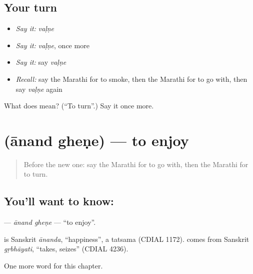 \subsection*{Your turn}
\begin{itemize}
\raggedright
  \item \emph{Say it:} \emph{vaḷṇe}
  \item \emph{Say it:} \emph{vaḷṇe}, once more
  \item \emph{Say it:} say \emph{vaḷṇe}
  \item \emph{Recall:} say the Marathi for to smoke, then the Marathi for to go with, then say \emph{vaḷṇe} again
\end{itemize}

\begin{tcolorbox}[breakable,colback=teal!4,colframe=teal!35!black,title={Before you move on}]
What does  mean? (\textquotedblleft{}To turn\textquotedblright{}.) Say it once more.
\end{tcolorbox}
\section[\texorpdfstring{\mr{आनंद} \mr{घेणे} (ānand gheṇe)}{आनंद घेणे (ānand gheṇe)}]{  (ānand gheṇe) — to enjoy}

\label{lesson:MR-C253-anand-ghene}



\begin{quote}
Before the new one: say the Marathi for to go with, then the Marathi for to turn.
\end{quote}

\subsection*{You'll want to know:  }
\textbf{ } — \emph{ānand gheṇe} — \textquotedblleft{}to enjoy\textquotedblright{}.

\begin{cousinweb}
\textbf{} is Sanskrit \emph{ānanda}, \textquotedblleft{}happiness\textquotedblright{}, a tatsama (CDIAL 1172). \textbf{} comes from Sanskrit \emph{gṛbhāyati}, \textquotedblleft{}takes, seizes\textquotedblright{} (CDIAL 4236).
\end{cousinweb}

\begin{grammarlens}[title={What you've built}]
One more word for this chapter.
\end{grammarlens}


